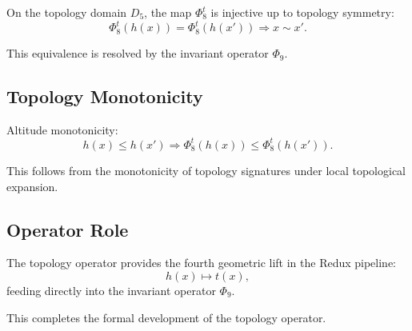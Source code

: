 On the topology domain $D_5$, the map $\Phi_8^t$ is injective up to topology
symmetry:
\[
\Phi_8^t(h(x)) = \Phi_8^t(h(x')) \Rightarrow x \sim x'.
\]

This equivalence is resolved by the invariant operator $\Phi_9$.

\subsection{Topology Monotonicity}

Altitude monotonicity:
\[
h(x) \le h(x') \Rightarrow \Phi_8^t(h(x)) \le \Phi_8^t(h(x')).
\]

This follows from the monotonicity of topology signatures under local
topological expansion.

\subsection{Operator Role}

The topology operator provides the fourth geometric lift in the Redux pipeline:
\[
h(x) \mapsto t(x),
\]
feeding directly into the invariant operator $\Phi_9$.

This completes the formal development of the topology operator.
